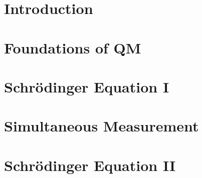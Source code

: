 \documentclass[british,11pt,a4paper]{report}
\begin{document}
\maketitle
\tableofcontents

\chapter{Introduction}

\chapter{Foundations of QM}

\chapter{Schr\"odinger Equation I}

\chapter{Simultaneous Measurement}

\chapter{Schr\"odinger Equation II}

\end{document}
